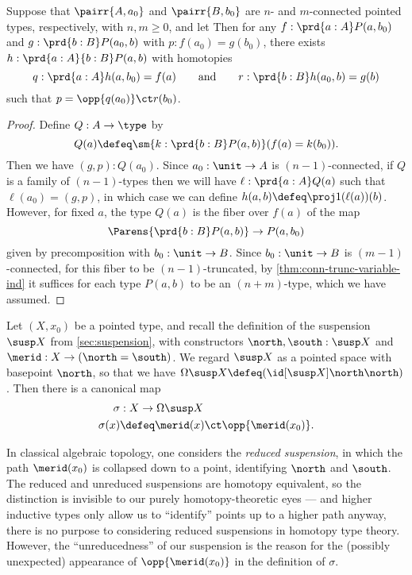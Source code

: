 {\begin{lem}\label{thm:wedge-connectivity}
  Suppose that $\pairr{A,a_0}$ and $\pairr{B,b_0}$ are $n$- and $m$-connected pointed types, respectively, with $n,m\geq0$, and let
%
%
Then for any ${f:\prd{a:A} P(a,b_0)}$ and ${g:\prd{b:B} P(a_0,b)}$ with $p:f(a_0) = g(b_0)$, there exists $h:\prd{a:A}{b:B} P(a,b)$ with homotopies
%
\begin{equation*}
  q:\prd{a:A} h(a,b_0)=f(a)
  \qquad\text{and}\qquad
  r:\prd{b:B} h(a_0,b)=g(b)
 \end{equation*}
%
such that $p = \opp{q(a_0)} \ct r(b_0)$.
\end{lem}
\begin{proof}
  Define $Q:A\to\type$ by
  \[ Q(a) \defeq \sm{k:\prd{b:B} P(a,b)} (f(a) = k(b_0)). \]
  Then we have $(g,p):Q(a_0)$.
  Since $a_0:\unit\to A$ is $(n-1)$-connected, if $Q$ is a family of $(n-1)$-types then we will have $\ell:\prd{a:A} Q(a)$ such that $\ell(a_0) = (g,p)$, in which case we can define $h(a,b) \defeq \proj1(\ell(a))(b)$.
  However, for fixed $a$, the type $Q(a)$ is the fiber over $f(a)$ of the map
  \[ \Parens{\prd{b:B} P(a,b) } \to P(a,b_0) \]
  given by precomposition with $b_0:\unit\to B$.
  Since $b_0:\unit\to B$ is $(m-1)$-connected, for this fiber to be $(n-1)$-truncated, by \cref{thm:conn-trunc-variable-ind} it suffices for each type $P(a,b)$ to be an $(n+m)$-type, which we have assumed.
\end{proof}

Let $(X,x_0)$ be a pointed type, and recall the definition of the suspension $\susp X$ from \cref{sec:suspension}, with constructors $\north,\south:\susp X$ and $\merid:X \to (\north=\south)$.
We regard $\susp X$ as a pointed space with basepoint $\north$, so that we have $\Omega\susp X \defeq (\id[\susp X]\north\north)$.
Then there is a canonical map
\begin{align*}
  \sigma &: X \to \Omega\susp X\\
  \sigma(x) &\defeq \merid(x) \ct \opp{\merid(x_0)}.
\end{align*}

\begin{rmk}
  In classical algebraic topology, one considers the \emph{reduced suspension}, in which the path $\merid(x_0)$ is collapsed down to a point, identifying $\north$ and $\south$.
  The reduced and unreduced suspensions are homotopy equivalent, so the distinction is invisible to our purely homotopy-theoretic eyes --- and higher inductive types only allow us to ``identify'' points up to a higher path anyway, there is no purpose to considering reduced suspensions in homotopy type theory.
  However, the ``unreducedness'' of our suspension is the reason for the (possibly unexpected) appearance of $\opp{\merid(x_0)}$ in the definition of $\sigma$.
\end{rmk}

}
